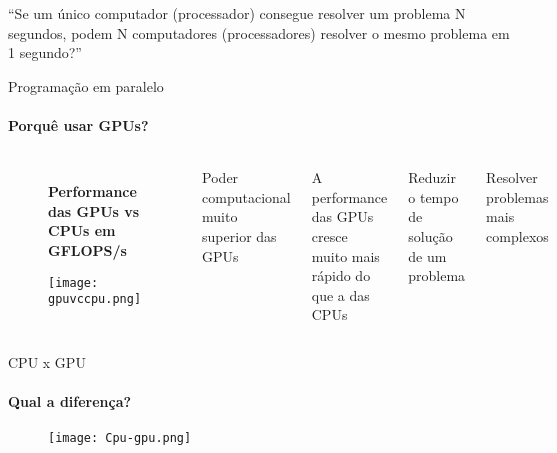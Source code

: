 \begin{frame}
    \begin{center}
        \vspace*{1.5cm}
        \justifying
        \huge{“Se um único computador (processador) consegue resolver um problema N segundos, podem N computadores (processadores) resolver o mesmo problema em 1 segundo?”}
    \end{center}
\end{frame}
\begin{frame}[t]{Programação em paralelo}
    \framesubtitle{Porquê usar GPUs?}
    \begin{columns}
        \begin{figure}
            \centering
            \textbf{Performance das GPUs vs CPUs em GFLOPS/s}\par\medskip
            \texttt{[image: gpuvccpu.png]}
        \end{figure}
        \vspace*{0.4cm}
        \itemize
        \item Poder computacional muito superior das GPUs
        \item A performance das GPUs cresce muito mais rápido do que a das CPUs
        \item Reduzir o tempo de solução de um problema
        \item Resolver problemas mais complexos
    \end{columns}
        
\end{frame}
\begin{frame}[t]{CPU x GPU}
    \framesubtitle{Qual a diferença?}
    \begin{figure}
        \texttt{[image: Cpu-gpu.png]}
    \end{figure}

\end{frame}
